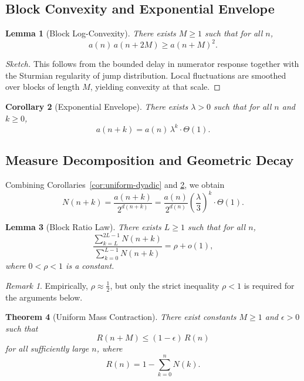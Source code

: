 \documentclass[12pt, oneside]{article}
\numberwithin{equation}{section}
\theoremstyle{definition}
\theoremstyle{plain}
\newtheorem{theorem}{Theorem}[section]
\newtheorem{lemma}[theorem]{Lemma}
\newtheorem{corollary}[theorem]{Corollary}
\theoremstyle{remark}
\newtheorem*{remark}{Remark}
\begin{document}
\subsection{Block Convexity and Exponential Envelope}
\label{sec:block-convexity}

\begin{lemma}[Block Log-Convexity]
\label{lem:block-convex}
There exists $M \ge 1$ such that for all $n$,
\[
a(n)\,a(n+2M) \ge a(n+M)^2.
\]
\end{lemma}

\begin{proof}[Sketch]
This follows from the bounded delay in numerator response together with
the Sturmian regularity of jump distribution. Local fluctuations are
smoothed over blocks of length $M$, yielding convexity at that scale.
\end{proof}

\begin{corollary}[Exponential Envelope]
\label{cor:exp-envelope}
There exists $\lambda > 0$ such that for all $n$ and $k \ge 0$,
\[
a(n+k) = a(n)\,\lambda^k \cdot \Theta(1).
\]
\end{corollary}

\subsection{Measure Decomposition and Geometric Decay}
\label{sec:measure-decay}

Combining Corollaries~\ref{cor:uniform-dyadic} and
\ref{cor:exp-envelope}, we obtain
\[
N(n+k)
= \frac{a(n+k)}{2^{d(n+k)}}
= \frac{a(n)}{2^{d(n)}} \left(\frac{\lambda}{3}\right)^k \cdot \Theta(1).
\]

\begin{lemma}[Block Ratio Law]
\label{lem:block-ratio}
There exists $L \ge 1$ such that for all $n$,
\[
\frac{\sum_{k=L}^{2L-1} N(n+k)}{\sum_{k=0}^{L-1} N(n+k)}
= \rho + o(1),
\]
where $0 < \rho < 1$ is a constant.
\end{lemma}

\begin{remark}
Empirically, $\rho \approx \tfrac{1}{2}$, but only the strict inequality
$\rho < 1$ is required for the arguments below.
\end{remark}

\begin{theorem}[Uniform Mass Contraction]
\label{thm:mass-contraction}
There exist constants $M \ge 1$ and $\epsilon > 0$ such that
\[
R(n+M) \le (1-\epsilon)\,R(n)
\]
for all sufficiently large $n$, where
\[
R(n) = 1 - \sum_{k=0}^{n} N(k).
\]
\end{theorem}
\end{document}
